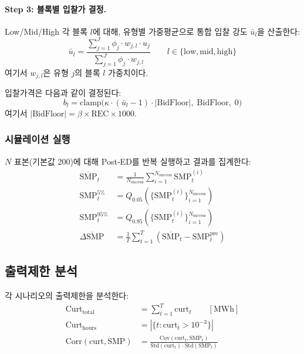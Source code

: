 \documentclass[11pt, a4paper]{article}
\begin{document}
\paragraph{Step 3: 블록별 입찰가 결정.}
Low/Mid/High 각 블록 $l$에 대해, 유형별 가중평균으로 통합 입찰 강도 $\bar{u}_l$을 산출한다:
\begin{equation}\label{eq:u_block}
    \bar{u}_l = \frac{\sum_{j=1}^{J} \phi_j \cdot w_{j,l} \cdot u_j}{\sum_{j=1}^{J} \phi_j \cdot w_{j,l}}
    \qquad l \in \{\text{low}, \text{mid}, \text{high}\}
\end{equation}
여기서 $w_{j,l}$은 유형 $j$의 블록 $l$ 가중치이다.

입찰가격은 다음과 같이 결정된다:
\begin{equation}\label{eq:bid_price_mc}
    \boxed{b_l = \text{clamp}\!\big(\kappa \cdot (\bar{u}_l - 1) \cdot |\text{BidFloor}|, \; \text{BidFloor}, \; 0\big)}
\end{equation}
여기서 $|\text{BidFloor}| = \beta \times \text{REC} \times 1000$.

\subsubsection{시뮬레이션 실행}

$N$ 표본(기본값 200)에 대해 Post-ED를 반복 실행하고 결과를 집계한다:
\begin{align}
    \overline{\text{SMP}}_t &= \frac{1}{N_{\text{success}}} \sum_{i=1}^{N_{\text{success}}} \text{SMP}_t^{(i)} \\
    \text{SMP}_t^{5\%} &= Q_{0.05}\!\left(\{\text{SMP}_t^{(i)}\}_{i=1}^{N_{\text{success}}}\right) \\
    \text{SMP}_t^{95\%} &= Q_{0.95}\!\left(\{\text{SMP}_t^{(i)}\}_{i=1}^{N_{\text{success}}}\right) \\
    \overline{\Delta\text{SMP}} &= \frac{1}{T} \sum_{t=1}^{T} \left(\overline{\text{SMP}}_t - \text{SMP}_t^{\text{pre}}\right)
\end{align}

\subsection{출력제한 분석}

각 시나리오의 출력제한을 분석한다:
\begin{align}
    \text{Curt}_{\text{total}} &= \sum_{t=1}^{T} \text{curt}_t \qquad [\text{MWh}] \\
    \text{Curt}_{\text{hours}} &= |\{t : \text{curt}_t > 10^{-3}\}| \\
    \text{Corr}(\text{curt}, \text{SMP}) &= \frac{\text{Cov}(\text{curt}_t, \text{SMP}_t)}
        {\text{Std}(\text{curt}_t) \cdot \text{Std}(\text{SMP}_t)}
\end{align}
\end{document}
